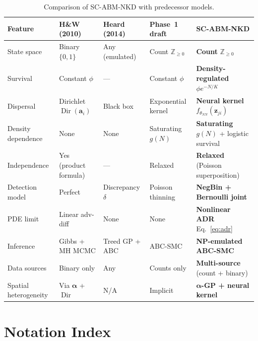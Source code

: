 \documentclass[12pt,a4paper]{article}
\theoremstyle{definition}
\newcommand{\Dir}{\operatorname{Dir}}
\newcommand{\bz}{\bm{z}}
\newcommand{\balpha}{\bm{\alpha}}
\newcommand{\nn}{f_{\theta_{NN}}}
\begin{document}
\begin{table}[h!]
\centering
\small
\renewcommand{\arraystretch}{1.4}
\begin{tabular}{p{2.9cm}p{2.9cm}p{2.8cm}p{2.6cm}p{2.6cm}}
\toprule
\textbf{Feature} &
\textbf{H\&W (2010)} &
\textbf{Heard (2014)} &
\textbf{Phase~1 draft} &
\textbf{SC-ABM-NKD} \\
\midrule
State space &
  Binary $\{0,1\}$ &
  Any (emulated) &
  Count $\mathbb{Z}_{\geq 0}$ &
  \textbf{Count} $\mathbb{Z}_{\geq 0}$ \\
Survival &
  Constant $\phi$ &
  --- &
  Constant $\phi$ &
  \textbf{Density-regulated} $\phi e^{-N/K}$ \\
Dispersal &
  Dirichlet $\Dir(\mathbf{a}_i)$ &
  Black box &
  Exponential kernel &
  \textbf{Neural kernel} $\nn(\bz_{ji})$ \\
Density dependence &
  None &
  None &
  Saturating $g(N)$ &
  \textbf{Saturating $g(N)$} + logistic survival \\
Independence &
  Yes (product formula) &
  --- &
  Relaxed &
  \textbf{Relaxed} (Poisson superposition) \\
Detection model &
  Perfect &
  Discrepancy $\delta$ &
  Poisson thinning &
  \textbf{NegBin + Bernoulli joint} \\
PDE limit &
  Linear adv-diff &
  None &
  None &
  \textbf{Nonlinear ADR} Eq.~\eqref{eq:adr} \\
Inference &
  Gibbs + MH MCMC &
  Treed GP + ABC &
  ABC-SMC &
  \textbf{NP-emulated ABC-SMC} \\
Data sources &
  Binary only &
  Any &
  Counts only &
  \textbf{Multi-source} (count + binary) \\
Spatial heterogeneity &
  Via $\balpha$ + $\Dir$ &
  N/A &
  Implicit &
  \textbf{$\balpha$-GP + neural kernel} \\
\bottomrule
\end{tabular}
\caption{Comparison of SC-ABM-NKD with predecessor models.}
\label{tab:novelty}
\end{table}

\section*{Notation Index}
\end{document}
